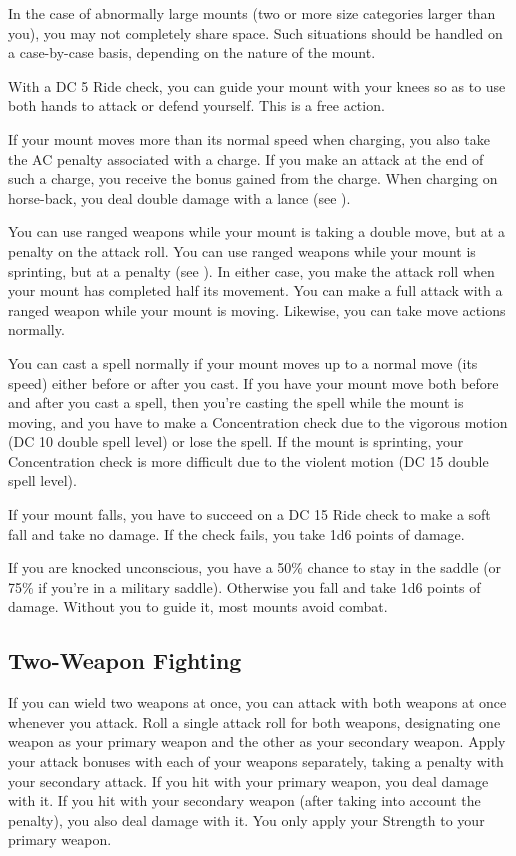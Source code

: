 In the case of abnormally large mounts (two or more size categories larger than you), you may not completely share space. Such situations should be handled on a case-by-case basis, depending on the nature of the mount.

 With a DC 5 Ride check, you can guide your mount with your knees so as to use both hands to attack or defend yourself. This is a free action.

If your mount moves more than its normal speed when charging, you also take the AC penalty associated with a charge. If you make an attack at the end of such a charge, you receive the bonus gained from the charge. When charging on horse-back, you deal double damage with a lance (see ).

You can use ranged weapons while your mount is taking a double move, but at a  penalty on the attack roll. You can use ranged weapons while your mount is sprinting, but at a  penalty (see ). In either case, you make the attack roll when your mount has completed half its movement. You can make a full attack with a ranged weapon while your mount is moving. Likewise, you can take move actions normally.

 You can cast a spell normally if your mount moves up to a normal move (its speed) either before or after you cast. If you have your mount move both before and after you cast a spell, then you're casting the spell while the mount is moving, and you have to make a Concentration check due to the vigorous motion (DC 10 \add double spell level) or lose the spell. If the mount is sprinting, your Concentration check is more difficult due to the violent motion (DC 15 \add double spell level).

 If your mount falls, you have to succeed on a DC 15 Ride check to make a soft fall and take no damage. If the check fails, you take 1d6 points of damage.

 If you are knocked unconscious, you have a 50\% chance to stay in the saddle (or 75\% if you're in a military saddle). Otherwise you fall and take 1d6 points of damage. Without you to guide it, most mounts avoid combat.

\subsection{Two-Weapon Fighting}\label{Two-Weapon Fighting}
If you can wield two weapons at once, you can attack with both weapons at once whenever you attack. Roll a single attack roll for both weapons, designating one weapon as your primary weapon and the other as your secondary weapon. Apply your attack bonuses with each of your weapons separately, taking a  penalty with your secondary attack. If you hit with your primary weapon, you deal damage with it. If you hit with your secondary weapon (after taking into account the  penalty), you also deal damage with it. You only apply your Strength to your primary weapon.

